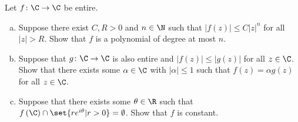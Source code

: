 \documentclass[10pt]{mypackage}
\begin{document}
\begin{problem}[Problem 3]
  Let $f\colon \C\rightarrow \C$ be entire.
  \begin{enumerate}[(a)]
    \item Suppose there exist $C,R > 0$ and $n\in \N$ such that $\left\vert f(z) \right\vert \leq C\left\vert z \right\vert^{n}$ for all $\left\vert z \right\vert > R$. Show that $f$ is a polynomial of degree at most $n$.
    \item Suppose that $g\colon \C\rightarrow \C$ is also entire and $ \left\vert f(z) \right\vert \leq \left\vert g(z) \right\vert $ for all $z\in \C$. Show that there exists some $\alpha\in \C$ with $\left\vert \alpha \right\vert \leq 1$ such that $f(z) = \alpha g(z)$ for all $z\in \C$.
    \item Suppose that there exists some $\theta\in \R$ such that $f\left( \C \right)\cap \set{re^{i\theta} | r > 0} = \emptyset$. Show that $f$ is constant.
  \end{enumerate}
\end{problem}
\end{document}
